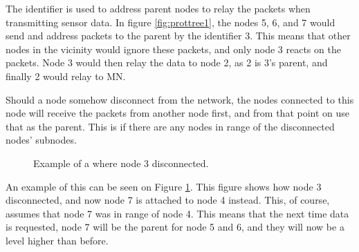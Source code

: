 The identifier is used to address parent nodes to relay the packets when transmitting sensor data. In figure \ref{fig:prottree1}, the nodes 5, 6, and 7 would send and address packets to the parent by the identifier 3. This means that other nodes in the vicinity would ignore these packets, and only node 3 reacts on the packets. Node 3 would then relay the data to node 2, as 2 is 3's parent, and finally 2 would relay to MN.

Should a node somehow disconnect from the network, the nodes connected to this node will receive the packets from another node first, and from that point on use that as the parent. This is if there are any nodes in range of the disconnected nodes' subnodes. 

\begin{figure}[!h]
	\centering
	\caption{Example of a where node 3 disconnected.}
	\label{fig:prottree2}
\end{figure}

An example of this can be seen on Figure \ref{fig:prottree2}. This figure shows how node 3 disconnected, and now node 7 is attached to node 4 instead. This, of course, assumes that node 7 was in range of node 4.
This means that the next time data is requested, node 7 will be the parent for node 5 and 6, and they will now be a level higher than before.
